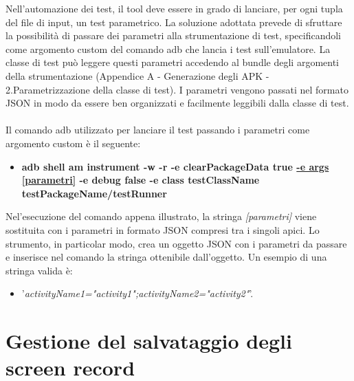 Nell'automazione dei test, il tool deve essere in grado di lanciare, per ogni tupla del file di input, un test parametrico. La soluzione adottata prevede di sfruttare la possibilità di passare dei parametri alla strumentazione di test, specificandoli come argomento custom del comando adb che lancia i test sull'emulatore. La classe di test può leggere questi parametri accedendo al bundle degli argomenti della strumentazione (Appendice A - Generazione degli APK - 2.Parametrizzazione della classe di test). I parametri vengono passati nel formato JSON in modo da essere ben organizzati e facilmente leggibili dalla classe di test. 
\\\\
Il comando adb utilizzato per lanciare il test passando i parametri come argomento custom è il seguente:
\begin{itemize}[nosep]
\item []\small{ \textbf{adb shell am instrument -w -r -e clearPackageData true \ul{-e args [parametri]}  -e debug false -e class  testClassName testPackageName/testRunner}}
\end{itemize}
Nel'esecuzione del comando appena illustrato, la stringa \emph{[parametri]} viene sostituita con i parametri in formato JSON compresi tra i singoli apici. Lo strumento, in particolar modo,  crea un oggetto JSON con i parametri da passare e inserisce nel comando la stringa ottenibile dall'oggetto. Un esempio di una stringa valida è: 
\begin{itemize}[nosep]
\item [] '\emph{activityName1="activity1";activityName2="activity2"}'.
\end{itemize} 


\section{Gestione del salvataggio degli screen record}  

